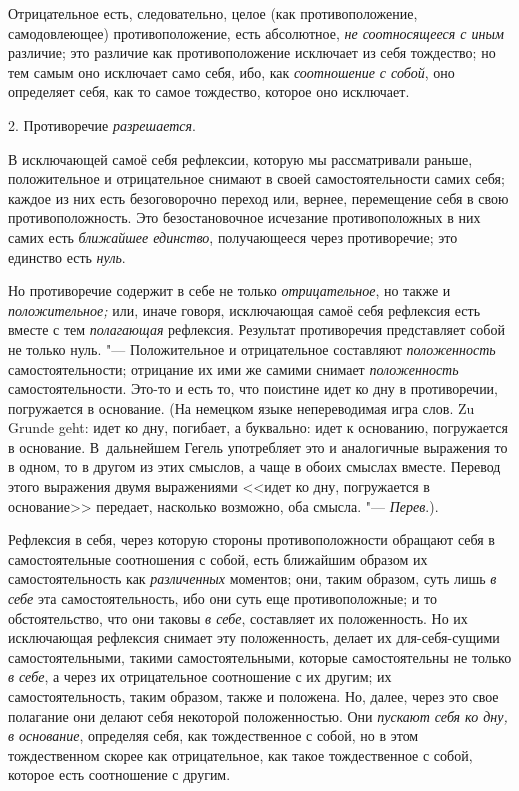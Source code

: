 Отрицательное есть, следовательно, целое (как противоположение,
самодовлеющее) противоположение, есть абсолютное,
{\em не соотносящееся с иным} различие; это различие
как противоположение исключает из себя тождество; но тем самым оно
исключает само себя, ибо, как {\em соотношение с
собой}, оно определяет себя, как то самое тождество, которое оно исключает.


\bigskip

2. Противоречие {\em разрешается}.

В исключающей самоё себя рефлексии, которую мы рассматривали раньше,
положительное и отрицательное снимают в своей самостоятельности самих себя;
каждое из них есть безоговорочно переход или, вернее, перемещение себя в
свою противоположность. Это безостановочное исчезание противоположных в них
самих есть {\em ближайшее единство}, получающееся через
противоречие; это единство есть {\em нуль}.

Но противоречие содержит в себе не только {\em отрицательное}, но также и
{\em положительное;} или, иначе говоря, исключающая
самоё себя рефлексия есть вместе с тем {\em полагающая}
рефлексия. Результат противоречия представляет собой не только нуль. "---
Положительное и отрицательное составляют
{\em положенность} самостоятельности; отрицание их ими
же самими снимает {\em положенность} самостоятельности.
Это-то и есть то, что поистине идет ко дну в противоречии, погружается в
основание. (На немецком языке непереводимая игра слов. Zu Grunde geht: идет
ко дну, погибает, а буквально: идет к основанию, погружается в основание.
В~дальнейшем Гегель употребляет это и аналогичные выражения то в одном, то в
другом из этих смыслов, а чаще в обоих смыслах вместе. Перевод этого
выражения двумя выражениями <<идет ко дну, погружается в основание>>
передает, насколько возможно, оба смысла. "---
{\em Перев}.).

Рефлексия в себя, через которую стороны противоположности обращают себя в
самостоятельные соотношения с собой, есть ближайшим образом их
самостоятельность как {\em различенных} моментов; они,
таким образом, суть лишь {\em в себе} эта
самостоятельность, ибо они суть еще противоположные; и то обстоятельство,
что они таковы {\em в себе}, составляет их
положенность. Но их исключающая рефлексия снимает эту положенность, делает
их для-себя-сущими самостоятельными, такими самостоятельными, которые
самостоятельны не только {\em в себе}, а через их
отрицательное соотношение с их другим; их самостоятельность, таким образом,
также и положена. Но, далее, через это свое полагание они делают себя
некоторой положенностью. Они {\em пускают себя ко дну,
в основание}, определяя себя, как тождественное с собой, но в этом
тождественном скорее как отрицательное, как такое тождественное с собой,
которое есть соотношение с другим.

